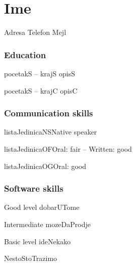 \documentclass{tccv}
\begin{document}
\part{Ime}
\personal
    {Adresa}
    {Telefon}
    {Mejl}
\section{Education}
\begin{yearlist}
\item[]{pocetakS -- krajS}
     {opisS}
     {}
\item{pocetakS -- krajC}
     {opisC}
     {}
\end{yearlist}
\section{Communication skills}
\begin{factlist}
\item{listaJedinicaNS}{Native speaker}
\item{listaJedinicaOF}{Oral: fair -- Written: good}
\item{listaJedinicaOG}{Oral: good}
\end{factlist}

\section{Software skills}
\begin{factlist}
\item{Good level}
     {dobarUTome}
\item{Intermediate}
     {mozeDaProdje}
\item{Basic level}
     {ideNekako}
\end{factlist}
\pagebreak

NestoStoTrazimo
\end{document}
